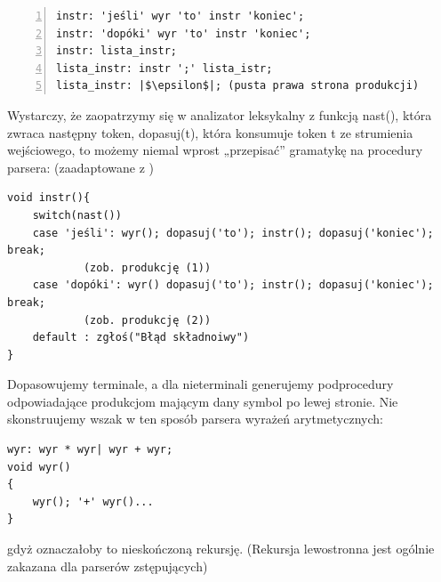 \begin{lstlisting}[numbers=left]
instr: 'jeśli' wyr 'to' instr 'koniec';
instr: 'dopóki' wyr 'to' instr 'koniec';
instr: lista_instr;
lista_instr: instr ';' lista_istr;
lista_instr: |$\epsilon$|; (pusta prawa strona produkcji)
\end{lstlisting}

Wystarczy, że zaopatrzymy się w analizator leksykalny z funkcją nast(), która zwraca następny token, dopasuj(t), która konsumuje token t ze strumienia wejściowego, to możemy niemal wprost „przepisać” gramatykę na procedury parsera: (zaadaptowane z \cite[str.~70]{DRAGON_BOOK})

\begin{lstlisting}
void instr(){
	switch(nast())
	case 'jeśli': wyr(); dopasuj('to'); instr(); dopasuj('koniec'); break; 
            (zob. produkcję (1))
	case 'dopóki': wyr() dopasuj('to'); instr(); dopasuj('koniec'); break;
            (zob. produkcję (2))
	default : zgłoś("Błąd składnoiwy")
}
\end{lstlisting}
Dopasowujemy terminale, a dla nieterminali generujemy podprocedury odpowiadające produkcjom mającym dany symbol po lewej stronie.
Nie skonstruujemy wszak w ten sposób parsera wyrażeń arytmetycznych:
\begin{lstlisting}
wyr: wyr * wyr| wyr + wyr;
void wyr()
{
    wyr(); '+' wyr()...
}
\end{lstlisting}
gdyż oznaczałoby to nieskończoną rekursję. (Rekursja lewostronna jest ogólnie zakazana dla parserów zstępujących)

